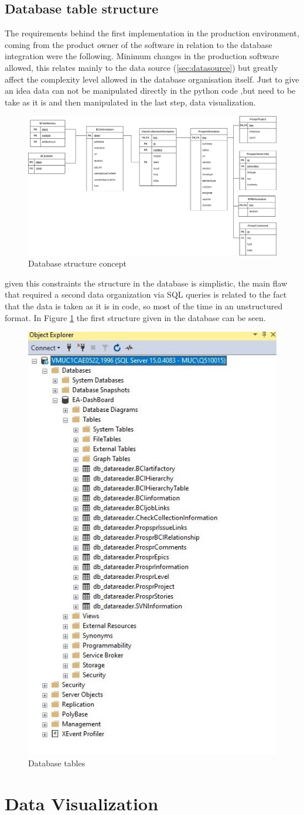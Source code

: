 \documentclass[../main.tex]{subfiles}
\begin{document}
\subsection{Database table structure}
The requirements behind the first implementation in the production environment, coming from the product owner of the software in relation to the database integration were the following. Minimum changes in the production software allowed, this relates mainly to the data source (\ref{sec:datasource}) but greatly affect the complexity level allowed in the database organisation itself. Just to give an idea data can not be manipulated directly in the python code ,but need to be take as it is and then manipulated in the last step, data visualization. 
\begin{figure}[H]
    \centering
    \includegraphics[width=\linewidth]{images_folder/EADBEntity.png}
    \caption{Database structure concept}
    \label{fig:dbsterconce}
\end{figure}
given this constraints the structure in the database is simplistic, the main flaw that required a second data organization via SQL queries is related to the fact that the data is taken as it is in code, so most of the time in an unstructured format. In Figure \ref{fig:dbsterconce} the first structure given in the database can be seen.
\begin{figure}[H]
    \centering
    \includegraphics[width=0.5\linewidth]{images_folder/databasetable.jpg}
    \caption{Database tables}
    \label{fig:dbtables}
\end{figure} 

\section{Data Visualization}
\cleardoublepage
\end{document}
